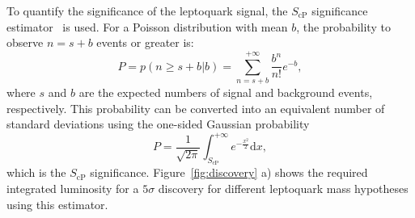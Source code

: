 \documentclass{cmspaper}
\begin{document}
\begin{linenumbers}
To quantify the significance of the
leptoquark signal, the 
$S_\text{cP}$ significance estimator~\cite{ref:scp} is used.  
For a Poisson distribution
with mean $b$,
the probability to observe $n=s+b$ events or greater is:
\begin{equation}
P = p(n\geq s+b|b) = \sum_{n=s+b}^{+\infty} \frac{b^n}{n!}e^{-b},
\end{equation}
where $s$ and $b$ are the expected numbers of signal and background events, respectively. This probability can be
converted into an equivalent number of standard deviations using the one-sided Gaussian probability
\begin{equation}
P = \frac{1}{\sqrt{2\pi}}\int_{S_\text{cP}}^{+\infty} e^{-\frac{x^2}{2}}\mathrm{d}x,
\label{eq:ScP}
\end{equation}
which is the $S_\text{cP}$ significance.
Figure~\ref{fig:discovery} a) shows the required integrated luminosity
for a $5\sigma$ discovery for different leptoquark mass hypotheses using this estimator. 


\end{linenumbers}
\end{document}
